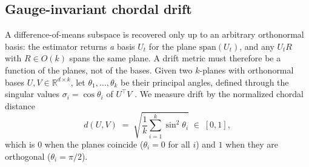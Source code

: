 \subsection{Gauge-invariant chordal drift}
\label{sec:drift}

A difference-of-means subspace is recovered only up to an arbitrary orthonormal basis: the
estimator returns \emph{a} basis $U_t$ for the plane $\mathrm{span}(U_t)$, and any
$U_t R$ with $R \in O(k)$ spans the same plane. A drift metric must therefore be a
function of the planes, not of the bases. Given two $k$-planes with orthonormal bases
$U, V \in \mathbb{R}^{d \times k}$, let $\theta_1, \dots, \theta_k$ be their principal
angles, defined through the singular values $\sigma_i = \cos\theta_i$ of $U^\top V$
\citep{edelman1998geometry}. We measure drift by the normalized chordal distance
\begin{equation}
\label{eq:chordal}
d(U, V) \;=\; \sqrt{\frac{1}{k} \sum_{i=1}^{k} \sin^2 \theta_i} \;\in\; [0, 1],
\end{equation}
which is $0$ when the planes coincide ($\theta_i = 0$ for all $i$) and $1$ when they are
orthogonal ($\theta_i = \pi/2$).

